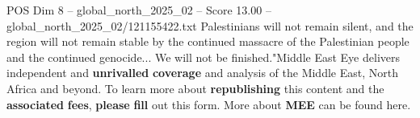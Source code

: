 \begin{textsample}{POS Dim 8 – global\_north\_2025\_02 – Score 13.00 – global\_north\_2025\_02/121155422.txt}
Palestinians will not remain silent, and the region will not remain stable by the continued massacre of the Palestinian people and the continued genocide...
We will not be finished."Middle East Eye delivers independent and \textbf{unrivalled} \textbf{coverage} and analysis of the Middle East, North Africa and beyond.
To learn more about \textbf{republishing} this content and the \textbf{associated} \textbf{fees}, \textbf{please} \textbf{fill} out this form.
More about \textbf{MEE} can be found here.

\end{textsample}
